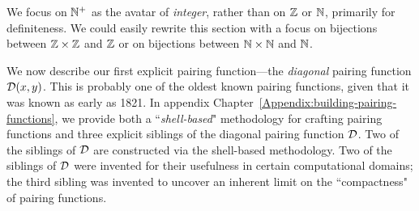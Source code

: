 We focus on $\mathbb{N}^+$ as the avatar of {\it integer}, rather than on $\mathbb{Z}$ or $\mathbb{N}$, primarily for definiteness.  We could easily rewrite this section with a focus on bijections between $\mathbb{Z} \times \mathbb{Z}$ and $\mathbb{Z}$ or on bijections between $\mathbb{N} \times \mathbb{N}$ and $\mathbb{N}$.

\bigskip

We now describe our first explicit pairing function---the {\em diagonal} pairing function $\mbox{$\cal D$}(x,y)$.  This is probably one of the oldest known pairing functions, given that it was known as early as 1821.   In appendix Chapter~\ref{Appendix:building-pairing-functions}, we provide both a ``{\em shell-based}" methodology for crafting pairing functions and three explicit siblings of the diagonal pairing function $\mbox{$\cal D$}$.  Two of the siblings of $\mbox{$\cal D$}$ are constructed via the shell-based methodology.  Two of the siblings of $\mbox{$\cal D$}$ were invented for their usefulness in certain computational domains; the third sibling was invented to uncover an inherent limit on the ``compactness" of pairing functions.




\medskip

